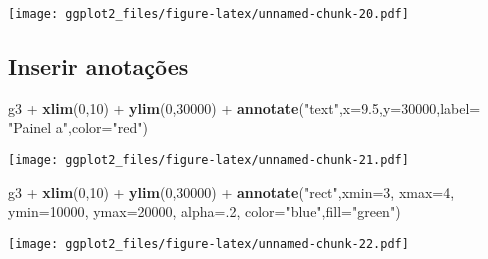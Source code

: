 \documentclass[]{article}
\newenvironment{Shaded}{\begin{snugshade}}{\end{snugshade}}
\newcommand{\KeywordTok}[1]{\textcolor[rgb]{0.13,0.29,0.53}{\textbf{{#1}}}}
\newcommand{\DataTypeTok}[1]{\textcolor[rgb]{0.13,0.29,0.53}{{#1}}}
\newcommand{\DecValTok}[1]{\textcolor[rgb]{0.00,0.00,0.81}{{#1}}}
\newcommand{\FloatTok}[1]{\textcolor[rgb]{0.00,0.00,0.81}{{#1}}}
\newcommand{\StringTok}[1]{\textcolor[rgb]{0.31,0.60,0.02}{{#1}}}
\newcommand{\NormalTok}[1]{{#1}}
\begin{document}
\texttt{[image: ggplot2\_files/figure-latex/unnamed-chunk-20.pdf]}

\newpage

\subsection{Inserir anotações}\label{inserir-anotacoes}

\begin{Shaded}
\begin{Highlighting}[]
\NormalTok{g3 +}\StringTok{ }\KeywordTok{xlim}\NormalTok{(}\DecValTok{0}\NormalTok{,}\DecValTok{10}\NormalTok{) +}\StringTok{ }\KeywordTok{ylim}\NormalTok{(}\DecValTok{0}\NormalTok{,}\DecValTok{30000}\NormalTok{) +}\StringTok{ }\KeywordTok{annotate}\NormalTok{(}\StringTok{"text"}\NormalTok{,}\DataTypeTok{x=}\FloatTok{9.5}\NormalTok{,}\DataTypeTok{y=}\DecValTok{30000}\NormalTok{,}\DataTypeTok{label=} \StringTok{"Painel a"}\NormalTok{,}\DataTypeTok{color=}\StringTok{"red"}\NormalTok{)}
\end{Highlighting}
\end{Shaded}

\texttt{[image: ggplot2\_files/figure-latex/unnamed-chunk-21.pdf]}

\newpage

\begin{Shaded}
\begin{Highlighting}[]
\NormalTok{g3 +}\StringTok{ }\KeywordTok{xlim}\NormalTok{(}\DecValTok{0}\NormalTok{,}\DecValTok{10}\NormalTok{) +}\StringTok{ }\KeywordTok{ylim}\NormalTok{(}\DecValTok{0}\NormalTok{,}\DecValTok{30000}\NormalTok{) +}
\StringTok{    }\KeywordTok{annotate}\NormalTok{(}\StringTok{"rect"}\NormalTok{,}\DataTypeTok{xmin=}\DecValTok{3}\NormalTok{, }\DataTypeTok{xmax=}\DecValTok{4}\NormalTok{, }\DataTypeTok{ymin=}\DecValTok{10000}\NormalTok{,}
             \DataTypeTok{ymax=}\DecValTok{20000}\NormalTok{, }\DataTypeTok{alpha=}\NormalTok{.}\DecValTok{2}\NormalTok{, }\DataTypeTok{color=}\StringTok{"blue"}\NormalTok{,}\DataTypeTok{fill=}\StringTok{"green"}\NormalTok{)}
\end{Highlighting}
\end{Shaded}

\texttt{[image: ggplot2\_files/figure-latex/unnamed-chunk-22.pdf]}

\newpage
\end{document}
